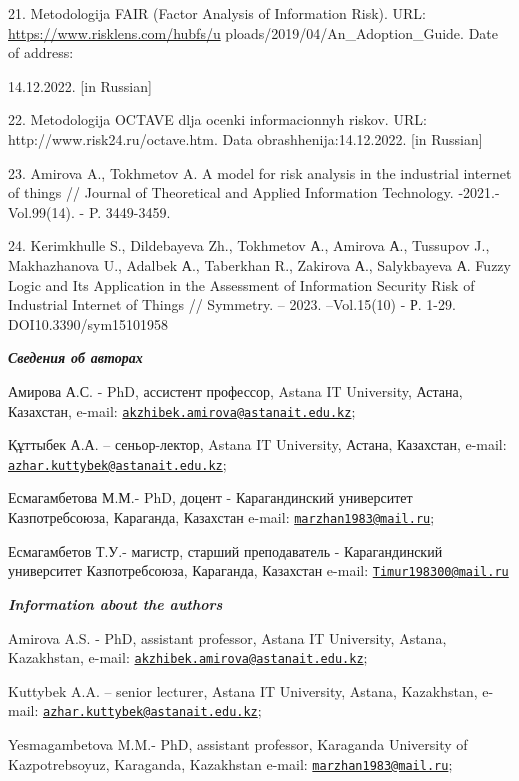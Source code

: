 21. Metodologija FAIR (Factor Analysis of Information Risk). URL:
\url{https://www.risklens.com/hubfs/u}
ploads/2019/04/An\_Adoption\_Guide. Date of address:

14.12.2022. {[}in Russian{]}

22. Metodologija OCTAVE dlja ocenki informacionnyh riskov. URL:
http://www.risk24.ru/octave.htm. Data obrashhenija:14.12.2022. {[}in
Russian{]}

23. Amirova A., Tokhmetov A. A model for risk analysis in the industrial
internet of things // Journal of Theoretical and Applied Information
Technology. -2021.- Vol.99(14). - P. 3449-3459.

24. Kerimkhulle S., Dildebayeva Zh., Tokhmetov А., Amirova А., Tussupov
J., Makhazhanova U., Adalbek А., Taberkhan R., Zakirova А., Salykbayeva
А. Fuzzy Logic and Its Application in the Assessment of Information
Security Risk of Industrial Internet of Things // Symmetry. -- 2023.
--Vol.15(10) - Р. 1-29. DOI10.3390/sym15101958

\emph{{\bfseries Сведения об авторах}}

Амирова А.С. - PhD, ассистент профессор, Astana IT University, Астана,
Казахстан, e-mail:
\href{mailto:akzhibek.amirova@astanait.edu.kz}{\nolinkurl{akzhibek.amirova@astanait.edu.kz}};

Құттыбек А.А. -- сеньор-лектор, Astana IT University, Астана, Казахстан,
e-mail:
\href{mailto:azhar.kuttybek@astanait.edu.kz}{\nolinkurl{azhar.kuttybek@astanait.edu.kz}};

Есмагамбетова М.М.- PhD, доцент - Карагандинский университет
Казпотребсоюза, Караганда, Казахстан e-mail:
\href{mailto:marzhan1983@mail.ru}{\nolinkurl{marzhan1983@mail.ru}};

Есмагамбетов Т.У.- магистр, старший преподаватель - Карагандинский
университет Казпотребсоюза, Караганда, Казахстан e-mail:
\href{mailto:Timur198300@mail.ru}{\nolinkurl{Timur198300@mail.ru}}

\emph{{\bfseries Information about the authors}}

Amirova A.S. - PhD, assistant professor, Astana IT University, Astana,
Kazakhstan, e-mail:
\href{mailto:akzhibek.amirova@astanait.edu.kz}{\nolinkurl{akzhibek.amirova@astanait.edu.kz}};

Kuttybek A.A. -- senior lecturer, Astana IT University, Astana,
Kazakhstan, e-mail:
\href{mailto:azhar.kuttybek@astanait.edu.kz}{\nolinkurl{azhar.kuttybek@astanait.edu.kz}};

Yesmagambetova M.M.- PhD, assistant professor, Karaganda University of
Kazpotrebsoyuz, Karaganda, Kazakhstan e-mail:
\href{mailto:marzhan1983@mail.ru}{\nolinkurl{marzhan1983@mail.ru}};


